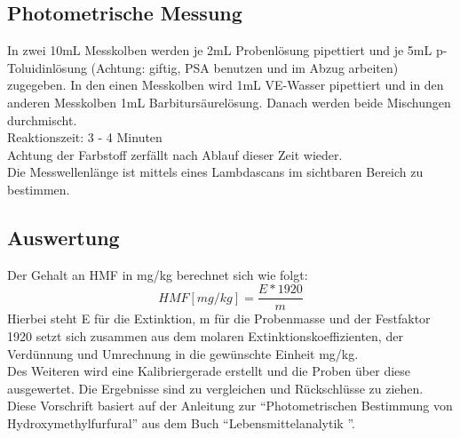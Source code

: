 \subsection{Photometrische Messung}
In zwei 10mL Messkolben werden je 2mL Probenlösung pipettiert und je 5mL p-Toluidinlösung (Achtung: giftig, PSA benutzen und im Abzug arbeiten) zugegeben. In den einen Messkolben wird 1mL VE-Wasser pipettiert und in den anderen Messkolben 1mL Barbitursäurelösung. Danach werden beide Mischungen durchmischt.\\ 
Reaktionszeit: 3 - 4 Minuten\\
Achtung der Farbstoff zerfällt nach Ablauf dieser Zeit wieder.\\
Die Messwellenlänge ist mittels eines Lambdascans im sichtbaren Bereich zu bestimmen.
\subsection{Auswertung}
Der Gehalt an HMF in mg/kg berechnet sich wie folgt:\\
\[HMF[mg/kg]=\frac{ E * 1920 }{ m }\]
Hierbei steht E für die Extinktion, m für die Probenmasse und der Festfaktor 1920 setzt sich zusammen aus dem molaren Extinktionskoeffizienten, der Verdünnung und Umrechnung in die gewünschte Einheit mg/kg.\\
Des Weiteren wird eine Kalibriergerade erstellt und die Proben über diese ausgewertet.
Die Ergebnisse sind zu vergleichen und Rückschlüsse zu ziehen.\\
Diese Vorschrift basiert auf der Anleitung zur ``Photometrischen Bestimmung von Hydroxymethylfurfural'' aus dem Buch ``Lebensmittelanalytik \cite{Lebensmittelanalytik}''.